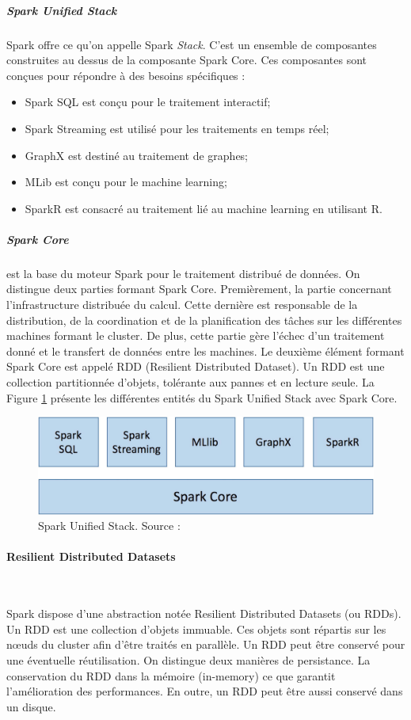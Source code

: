 \subparagraph{Spark Unified Stack} \label{Spark Uniffied-Stack}Spark offre ce qu'on appelle Spark \textit{Stack}. C'est un ensemble de composantes construites au dessus de la composante Spark Core.  Ces composantes sont conçues pour répondre à des besoins spécifiques :
\begin{itemize}
	\item Spark SQL  est conçu pour le traitement interactif;
	\item Spark Streaming est utilisé pour les traitements en temps réel;
	\item  GraphX est destiné au traitement de graphes;
	\item MLib est conçu pour le machine learning;
	\item SparkR est consacré au traitement lié au machine learning en utilisant  R.
\end{itemize}
\subparagraph{Spark Core} est la base du moteur Spark pour le traitement distribué de données.  On distingue deux parties formant Spark Core. Premièrement, la partie concernant l'infrastructure distribuée du calcul. Cette dernière est responsable de la distribution, de la coordination et de la planification des tâches  sur les différentes machines formant le cluster. De plus, cette partie gère l'échec d'un traitement donné et le transfert de données entre les machines. Le deuxième élément formant Spark Core est appelé RDD (Resilient Distributed Dataset). Un RDD est une collection partitionnée d'objets, tolérante aux pannes et en lecture seule. 
La Figure \ref{fig:unified-stack}  présente les différentes entités du Spark Unified Stack avec Spark Core.
\begin{figure}[H]
	\centering
	\captionsetup{justification=centering}
	\includegraphics[width=0.7\linewidth]{illustrations/unified-stack}
	\caption{ Spark Unified Stack. Source : \cite{eginning-Apache-Spark-2-unified-stack}}
	\label{fig:unified-stack}
\end{figure}

\paragraph{Resilient Distributed Datasets}~


Spark dispose d'une abstraction notée Resilient Distributed Datasets (ou RDDs). Un RDD est une collection d'objets immuable. Ces objets sont répartis sur les n\oe{}uds du cluster afin d'être traités en parallèle. Un RDD peut être conservé  pour une éventuelle réutilisation. On distingue deux manières de persistance. La conservation du RDD dans la mémoire (in-memory) ce que garantit l'amélioration des performances. En outre, un RDD peut être aussi conservé dans un disque. 

